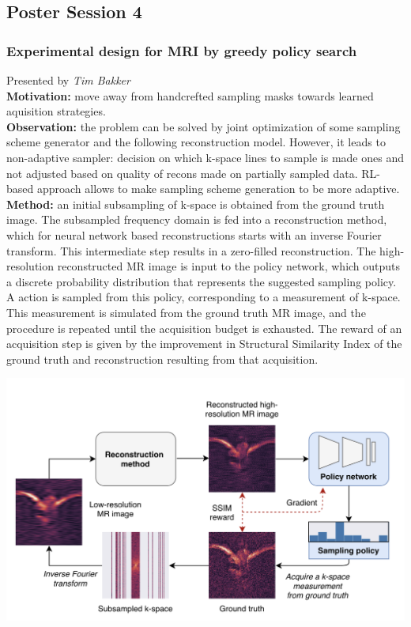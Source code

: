 \subsection{Poster Session 4}
\subsubsection{Experimental design for MRI by greedy policy search \cite{BakkerHW20}}

Presented by \textit{Tim Bakker} \\

{\bf Motivation:} move away from handcrefted sampling masks towards learned aquisition strategies. \\

{\bf Observation:} the problem can be solved by joint optimization of some sampling scheme generator and the following reconstruction model. 
However, it leads to non-adaptive sampler: decision on which k-space lines to sample is made ones and not adjusted based on quality of recons made on partially sampled data. 
RL-based approach allows to make sampling scheme generation to be more adaptive. \\

{\bf Method:} an initial subsampling of k-space is obtained from the ground truth image.
The subsampled frequency domain is fed into a reconstruction method, which for neural network based reconstructions starts with an inverse Fourier transform. This intermediate step results in a zero-filled reconstruction.
The high-resolution reconstructed MR image is input to the policy network, which outputs a discrete probability distribution that represents the suggested sampling policy.
A action is sampled from this policy, corresponding to a measurement of k-space.
This measurement is simulated from the ground truth MR image, and the procedure is repeated until the acquisition budget is exhausted.
The reward of an acquisition step is given by the improvement in Structural Similarity Index of the ground truth and reconstruction resulting from that acquisition. \\

\begin{center}
  \includegraphics[scale=0.4]{neurips-2020/images/Screenshot 2020-12-10 at 11.12.09.png} \\
\end{center}

